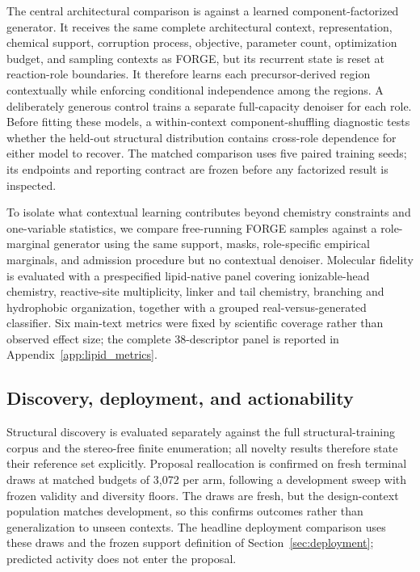 \documentclass{article}
\newcommand{\ArmBudget}{3{,}072}
\newcommand{\MainMetricCount}{Six}            %
\newcommand{\PanelSize}{38}                   %
\begin{document}
The central architectural comparison is against a learned component-factorized generator. It receives
the same complete architectural context, representation, chemical support, corruption process,
objective, parameter count, optimization budget, and sampling contexts as FORGE, but its recurrent
state is reset at reaction-role boundaries. It therefore learns each precursor-derived region
contextually while enforcing conditional independence among the regions. A deliberately generous
control trains a separate full-capacity denoiser for each role. Before fitting these models, a
within-context component-shuffling diagnostic tests whether the held-out structural distribution
contains cross-role dependence for either model to recover. The matched comparison uses five paired
training seeds; its endpoints and reporting contract are frozen before any factorized result is
inspected.

To isolate what contextual learning contributes beyond chemistry constraints and one-variable
statistics, we compare free-running FORGE samples against a role-marginal generator using the
same support, masks, role-specific empirical marginals, and admission procedure but no contextual
denoiser. Molecular fidelity is evaluated with a prespecified lipid-native panel covering
ionizable-head chemistry, reactive-site multiplicity, linker and tail chemistry, branching and
hydrophobic organization, together with a grouped real-versus-generated classifier.
\MainMetricCount{} main-text metrics were fixed by scientific coverage rather than observed effect
size; the complete \PanelSize{}-descriptor panel is reported in Appendix~\ref{app:lipid_metrics}.

\subsection{Discovery, deployment, and actionability}
\label{sec:protocol}
Structural discovery is evaluated separately against the full structural-training corpus and the
stereo-free finite enumeration; all novelty results therefore state their reference set explicitly.
Proposal reallocation is confirmed on fresh terminal draws at matched budgets of \ArmBudget{} per arm,
following a development sweep with frozen validity and diversity floors. The draws are fresh, but the
design-context population matches development, so this confirms outcomes rather than generalization to
unseen contexts. The headline deployment comparison uses these draws and the frozen support definition
of Section~\ref{sec:deployment}; predicted activity does not enter the proposal.
\end{document}
